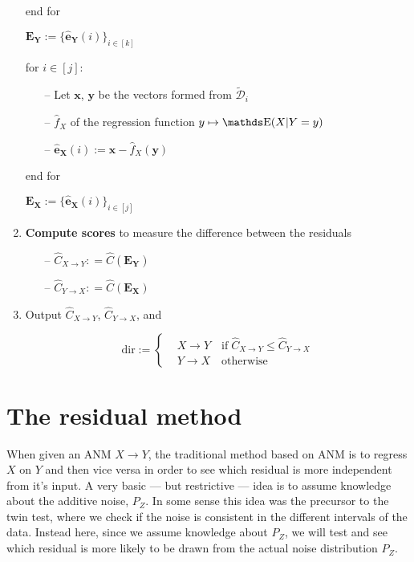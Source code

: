 \begin{algorithm}[H]
\begin{enumerate}
        end for

        $\mathbf{E_Y} := \{ \mathbf{\hat{e}_{Y}}(i) \}_{i \in [k]} $

        for $i \in [j]:$

        \begin{itemize}
            \item[--] Let $\mathbf{x}$, $\mathbf{y}$ be the vectors formed from $\tilde{\mathcal{D}}_i$
            \item[--] $\hat{f}_X$ of the regression function $y \mapsto \E(X | Y=y)$
            \item[--] $ \mathbf{\hat{e}_{X}}(i) := \mathbf{x} - \hat{f}_X(\mathbf{y})$
        \end{itemize}

        end for

        $\mathbf{E_X} := \{ \mathbf{\hat{e}_{X}}(i) \}_{i \in [j]} $

        \item \textbf{Compute scores} to measure the difference between the residuals
        \begin{itemize}
            \item[--] $\hat{C}_{X \rightarrow Y}: = \hat{C}( \mathbf{E_Y} )$ 
            \item[--] $\hat{C}_{Y \rightarrow X}: = \hat{C}( \mathbf{E_X} )$
        \end{itemize}        

        \item Output $\hat{C}_{X \rightarrow Y}$, $\hat{C}_{Y \rightarrow X}$, and
        
        \[ 
        \text{dir} :=  
         \begin{cases} 
            & X \rightarrow Y \quad \text{if} \; \hat{C}_{X \rightarrow Y} \leq \hat{C}_{Y \rightarrow X}\\
            & Y \rightarrow X \quad \text{otherwise}
         \end{cases}
        \]
        
    \end{enumerate}

  \label{alg:twin_test}
  \end{algorithm}

\newpage
\section{The residual method}

When given an ANM $X \rightarrow Y $, the traditional method based on ANM is to regress $X$ on 
$Y$ and then vice versa in order to see which residual is more independent from it's input. A
very basic --- but restrictive --- idea is to assume knowledge about the additive noise, $P_Z$. 
In some sense this idea was the precursor to the twin test, where we check if the noise is consistent
in the different intervals of the data. Instead here, since we assume knowledge about $P_Z$, we 
will test and see which residual is more likely to be drawn from the actual noise distribution $P_Z$.


